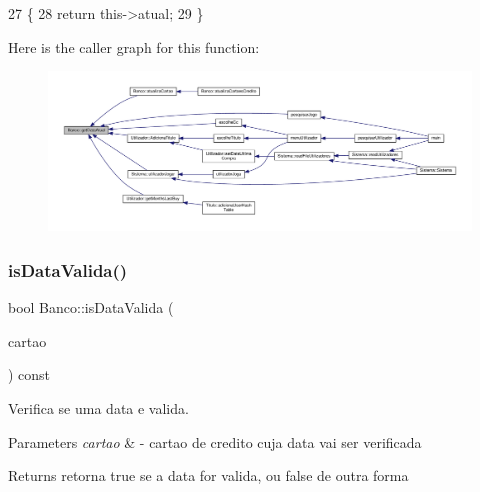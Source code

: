 \begin{DoxyCode}
27 \{
28     \textcolor{keywordflow}{return} this->atual;
29 \}
\end{DoxyCode}
Here is the caller graph for this function\+:
\nopagebreak
\begin{figure}[H]
\begin{center}
\leavevmode
\includegraphics[width=350pt]{classBanco_a0735f07636c578666068a16f6ecccd91_icgraph}
\end{center}
\end{figure}
\mbox{\label{classBanco_ac469cc9db5980081701bf9eb27a7e612}} 
\subsubsection{\texorpdfstring{is\+Data\+Valida()}{isDataValida()}}
{\footnotesize\ttfamily bool Banco\+::is\+Data\+Valida (\begin{DoxyParamCaption}\item[{const \hyperlink{classCartaoCredito}{Cartao\+Credito} \&}]{cartao }\end{DoxyParamCaption}) const}



Verifica se uma data e valida. 


\begin{DoxyParams}{Parameters}
{\em cartao} & -\/ cartao de credito cuja data vai ser verificada \\
\hline
\end{DoxyParams}
\begin{DoxyReturn}{Returns}
retorna true se a data for valida, ou false de outra forma 
\end{DoxyReturn}

